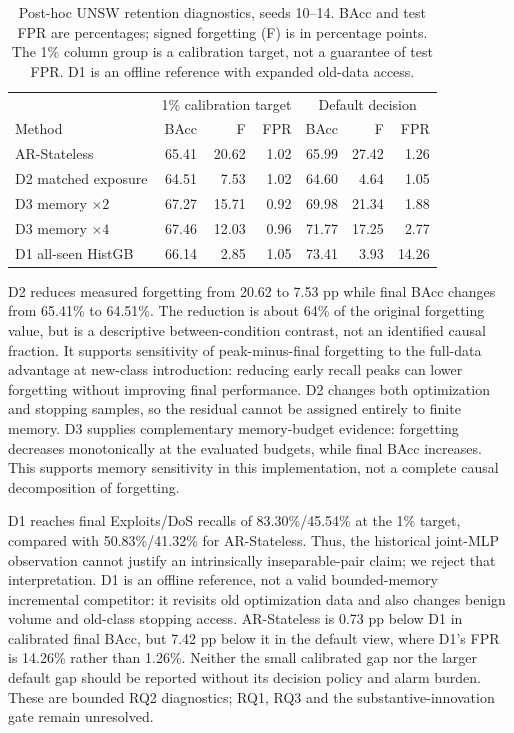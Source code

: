\documentclass[10pt,twocolumn]{article}
\begin{document}
\begin{table}[t]
\centering\small
\setlength{\tabcolsep}{4pt}
\caption{Post-hoc UNSW retention diagnostics, seeds 10--14. BAcc and test FPR are percentages; signed forgetting (F) is in percentage points. The 1\% column group is a calibration target, not a guarantee of test FPR. D1 is an offline reference with expanded old-data access.}
\label{tab:retention-diagnostics}
\scriptsize\setlength{\tabcolsep}{3pt}
\begin{tabular}{lrrrrrr}\toprule
&\multicolumn{3}{c}{1\% calibration target}&\multicolumn{3}{c}{Default decision}\\
Method &BAcc&F&FPR&BAcc&F&FPR\\\midrule
AR-Stateless &65.41&20.62&1.02&65.99&27.42&1.26\\
D2 matched exposure &64.51&7.53&1.02&64.60&4.64&1.05\\
D3 memory $\times2$ &67.27&15.71&0.92&69.98&21.34&1.88\\
D3 memory $\times4$ &67.46&12.03&0.96&71.77&17.25&2.77\\
D1 all-seen HistGB &66.14&2.85&1.05&73.41&3.93&14.26\\\bottomrule
\end{tabular}
\end{table}

D2 reduces measured forgetting from 20.62 to 7.53 pp while final BAcc changes from 65.41\% to 64.51\%. The reduction is about 64\% of the original forgetting value, but is a descriptive between-condition contrast, not an identified causal fraction. It supports sensitivity of peak-minus-final forgetting to the full-data advantage at new-class introduction: reducing early recall peaks can lower forgetting without improving final performance. D2 changes both optimization and stopping samples, so the residual cannot be assigned entirely to finite memory. D3 supplies complementary memory-budget evidence: forgetting decreases monotonically at the evaluated budgets, while final BAcc increases. This supports memory sensitivity in this implementation, not a complete causal decomposition of forgetting.

D1 reaches final Exploits/DoS recalls of 83.30\%/45.54\% at the 1\% target, compared with 50.83\%/41.32\% for AR-Stateless. Thus, the historical joint-MLP observation cannot justify an intrinsically inseparable-pair claim; we reject that interpretation. D1 is an offline reference, not a valid bounded-memory incremental competitor: it revisits old optimization data and also changes benign volume and old-class stopping access. AR-Stateless is 0.73 pp below D1 in calibrated final BAcc, but 7.42 pp below it in the default view, where D1's FPR is 14.26\% rather than 1.26\%. Neither the small calibrated gap nor the larger default gap should be reported without its decision policy and alarm burden. These are bounded RQ2 diagnostics; RQ1, RQ3 and the substantive-innovation gate remain unresolved.
\end{document}
